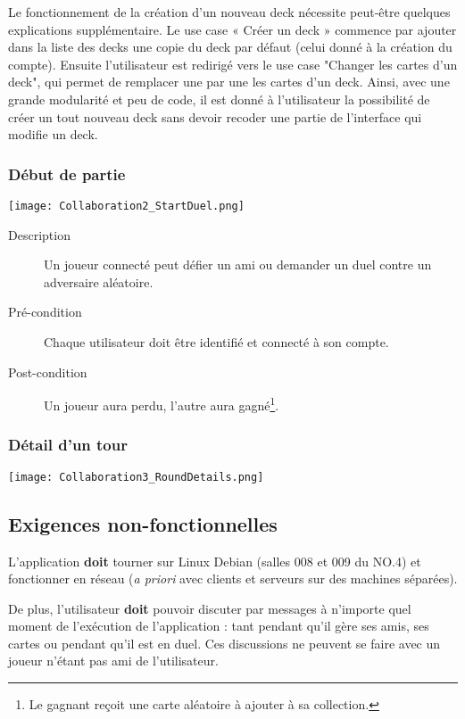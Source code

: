 \documentclass[12pt]{article}
\let\simplesubsection\subsection
\renewcommand{\subsection}{
	\needspace{0.5\pagetotal}
	\simplesubsection
}
\newcommand{\doit}{\textbf{doit} }
\begin{document}
			Le fonctionnement de la création d'un nouveau \gls{deck} nécessite peut-être quelques explications
			supplémentaire. 
			Le use case « Créer un \gls{deck} » commence par ajouter dans la liste des \glspl{deck}
			une copie du \gls{deck} par défaut (celui donné à la création du compte). Ensuite l'utilisateur
			est redirigé vers le use case "Changer les cartes d'un \gls{deck}", qui permet de remplacer
			une par une les cartes d'un \gls{deck}. 
			Ainsi, avec une grande modularité et peu de code,
			il est donné à l'utilisateur la possibilité de créer un tout nouveau \gls{deck} sans devoir recoder une partie
			de l'interface qui modifie un \gls{deck}.

		\subsubsection{Début de partie}
			\begin{center}\texttt{[image: Collaboration2\_StartDuel.png]}\end{center}

			\begin{description}
				\item[Description] Un joueur connecté peut défier un ami ou demander un \gls{duel} contre un adversaire aléatoire.
				\item[Pré-condition] Chaque utilisateur doit être identifié et connecté à son compte.
				\item[Post-condition] Un joueur aura perdu, l'autre aura gagné\footnote{Le gagnant reçoit une carte aléatoire à ajouter à sa collection.}.
			\end{description}

		\subsubsection{Détail d'un tour}
			\begin{center}\texttt{[image: Collaboration3\_RoundDetails.png]}\end{center}

	\subsection{Exigences non-fonctionnelles}
		L'application \doit tourner sur Linux Debian (salles 008 et 009 du NO.4) et fonctionner en réseau (\textit{a priori} avec clients
		et serveurs sur des machines séparées).

		De plus, l'utilisateur \doit pouvoir discuter par messages à n'importe quel moment de l'exécution de l'application : tant pendant
		qu'il gère ses amis, ses cartes ou pendant qu'il est en \gls{duel}. Ces discussions ne peuvent se faire avec un joueur
		n'étant pas ami de l'utilisateur.
\end{document}
